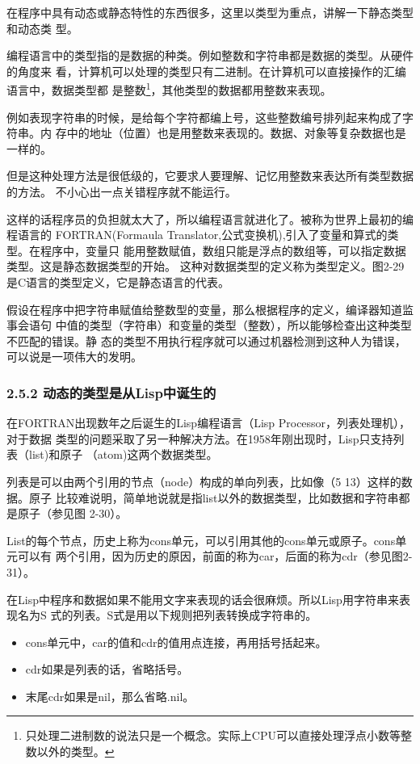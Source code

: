 \documentclass[11pt]{ctexart}
\begin{document}
在程序中具有动态或静态特性的东西很多，这里以类型为重点，讲解一下静态类型和动态类
型。

编程语言中的类型指的是数据的种类。例如整数和字符串都是数据的类型。从硬件的角度来
看，计算机可以处理的类型只有二进制。在计算机可以直接操作的汇编语言中，数据类型都
是整数\footnote{只处理二进制数的说法只是一个概念。实际上CPU可以直接处理浮点小数等整
数以外的类型。}，其他类型的数据都用整数来表现。

例如表现字符串的时候，是给每个字符都编上号，这些整数编号排列起来构成了字符串。内
存中的地址（位置）也是用整数来表现的。数据、对象等复杂数据也是一样的。

但是这种处理方法是很低级的，它要求人要理解、记忆用整数来表达所有类型数据的方法。
不小心出一点关错程序就不能运行。

这样的话程序员的负担就太大了，所以编程语言就进化了。被称为世界上最初的编程语言的
FORTRAN(Formaula Translator,公式变换机),引入了变量和算式的类型。在程序中，变量只
能用整数赋值，数组只能是浮点的数组等，可以指定数据类型。这是静态数据类型的开始。
这种对数据类型的定义称为类型定义。图2-29是C语言的类型定义，它是静态语言的代表。

假设在程序中把字符串赋值给整数型的变量，那么根据程序的定义，编译器知道监事会语句
中值的类型（字符串）和变量的类型（整数），所以能够检查出这种类型不匹配的错误。静
态的类型不用执行程序就可以通过机器检测到这种人为错误，可以说是一项伟大的发明。
\subsubsection{2.5.2 动态的类型是从Lisp中诞生的}
\label{sec:orga6a5421}

在FORTRAN出现数年之后诞生的Lisp编程语言（Lisp Processor，列表处理机），对于数据
类型的问题采取了另一种解决方法。在1958年刚出现时，Lisp只支持列表（list)和原子
（atom)这两个数据类型。

列表是可以由两个引用的节点（node）构成的单向列表，比如像（5 13）这样的数据。原子
比较难说明，简单地说就是指list以外的数据类型，比如数据和字符串都是原子（参见图
2-30）。

List的每个节点，历史上称为cons单元，可以引用其他的cons单元或原子。cons单元可以有
两个引用，因为历史的原因，前面的称为car，后面的称为cdr（参见图2-31）。

在Lisp中程序和数据如果不能用文字来表现的话会很麻烦。所以Lisp用字符串来表现名为S
式的列表。S式是用以下规则把列表转换成字符串的。

\begin{itemize}
\item cons单元中，car的值和cdr的值用点连接，再用括号括起来。
\item cdr如果是列表的话，省略括号。
\item 末尾cdr如果是nil，那么省略.nil。
\end{itemize}
\end{document}
